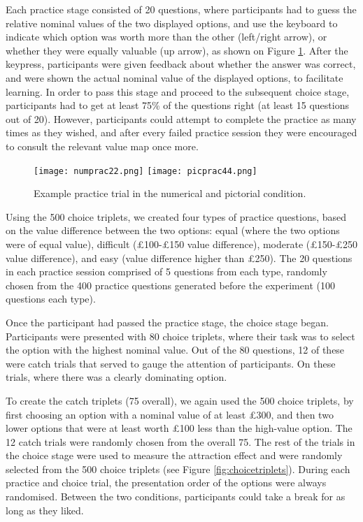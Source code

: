 \documentclass[11pt,a4paper]{article}
\begin{document}
Each practice stage consisted of 20 questions, where participants had to guess the relative nominal values of the two displayed options, and use the keyboard to indicate which option was worth more than the other (left/right arrow), or whether they were equally valuable (up arrow), as shown on Figure \ref{fig:practicetrial}. After the keypress, participants were given feedback about whether the answer was correct, and were shown the actual nominal value of the displayed options, to facilitate learning.
In order to pass this stage and proceed to the subsequent choice stage, participants had to get at least 75\% of the questions right (at least 15 questions out of 20). However, participants could attempt to complete the practice as many times as they wished, and after every failed practice session they were encouraged to consult the relevant value map once more. 


\begin{figure}[htp!]
\centering
\texttt{[image: numprac22.png]}
\texttt{[image: picprac44.png]}
\caption{Example practice trial in the numerical and pictorial condition.}
\label{fig:practicetrial}
\end{figure}


Using the 500 choice triplets, we created four types of practice questions, based on the value difference between the two options: equal (where the two options were of equal value), difficult (£100-£150 value difference), moderate (£150-£250 value difference), and easy (value difference higher than £250). The 20 questions in each practice session comprised of 5 questions from each type, randomly chosen from the 400 practice questions generated before the experiment (100 questions each type).


Once the participant had passed the practice stage, the choice stage began. Participants were presented with 80 choice triplets, where their task was to select the option with the highest nominal value. Out of the 80 questions, 12 of these were catch trials that served to gauge the attention of participants. On these trials, where there was a clearly dominating option. 

To create the catch triplets (75 overall), we again used the 500 choice triplets, by first choosing an option with a nominal value of at least £300, and then two lower options that were at least worth £100 less than the high-value option. The 12 catch trials were randomly chosen from the overall 75. The rest of the trials in the choice stage were used to measure the attraction effect and were randomly selected from the 500 choice triplets (see Figure \ref{fig:choicetriplets}). During each practice and choice trial, the presentation order of the options were always randomised. Between the two conditions, participants could take a break for as long as they liked.
\end{document}
